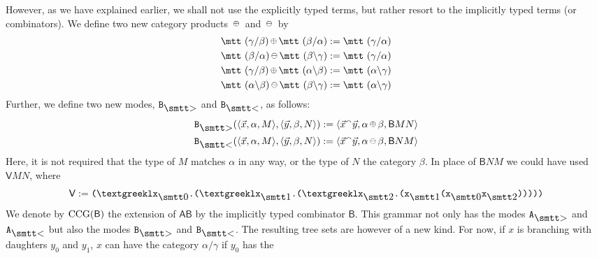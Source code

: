 However, as we have explained earlier, we shall not use the
explicitly typed terms, but rather resort to the implicitly
typed terms (or combinators). We define two new category 
\index{$\circplus$, $\circminus$}%
products $\circplus$ and $\circminus$ by
\begin{subequations}
\begin{align}
\mbox{\mtt ($\gamma${\tf}$\beta$)}   
	\circplus \mbox{\mtt ($\beta${\tf}$\alpha$)} & 
    := \mbox{\mtt ($\gamma${\tf}$\alpha$)} \\
\mbox{\mtt ($\beta${\tf}$\alpha$)}  
	\circminus \mbox{\mtt ($\beta${\tb}$\gamma$)} &
    := \mbox{\mtt ($\gamma${\tf}$\alpha$)} \\
\mbox{\mtt ($\gamma${\tf}$\beta$)}  
	\circplus \mbox{\mtt ($\alpha${\tb}$\beta$)} &
    := \mbox{\mtt ($\alpha${\tb}$\gamma$)} \\
\mbox{\mtt ($\alpha${\tb}$\beta$)}  
	\circminus \mbox{\mtt ($\beta${\tb}$\gamma$)} &
    := \mbox{\mtt ($\alpha${\tb}$\gamma$)}
\end{align}
\end{subequations}
Further, we define two new modes, $\mbox{\tt B}_{\sgr}$ and
$\mbox{\tt B}_{\skl}$, as follows:
\begin{align}
\mbox{\tt B}_{\sgr}(\auf \vec{x},\alpha,M\zu,
\auf \vec{y},\beta,N\zu) & := 
\auf \vec{x}\conc\vec{y}, \alpha \circplus \beta, \mathsf{B}MN\zu \\
\mbox{\tt B}_{\skl}(\auf \vec{x},\alpha,M\zu,
\auf \vec{y},\beta,N\zu) & := 
\auf \vec{x}\conc\vec{y}, \alpha \circminus \beta, \mathsf{B}NM\zu
\end{align}
Here, it is not required that the type of $M$ matches $\alpha$ in
any way, or the type of $N$ the category $\beta$.
In place of $\mathsf{B}NM$ we could
have used $\mathsf{V}MN$, where
\begin{equation}
\mathsf{V} :=
\mbox{\tt (\stlambda x}_{\snull}\mbox{\tt .(\stlambda x}_{\seins}%
\mbox{\tt .(\stlambda x}_{\szwei}\mbox{\tt .(x}_{\seins}\mbox{\tt %
(x}_{\snull}\mbox{\tt x}_{\szwei}\mbox{\tt )))))}
\end{equation}
We denote by $\operatorname{CCG}(\mathsf{B})$ the extension of $\mathsf{AB}$ by
the implicitly typed combinator $\mathsf{B}$.
This grammar not only has the modes $\mbox{\tt A}_{\sgr}$ and
$\mbox{\tt A}_{\skl}$ but also the modes $\mbox{\tt B}_{\sgr}$ and
$\mbox{\tt B}_{\skl}$. The resulting tree sets are however of a new
kind. For now, if $x$ is branching with daughters $y_0$ and $y_1$,
$x$ can have the category $\alpha/\gamma$ if $y_0$ has the
